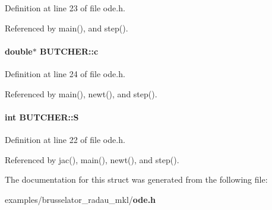 Definition at line 23 of file ode.\+h.



Referenced by main(), and step().

\paragraph[{c}]{\setlength{\rightskip}{0pt plus 5cm}double$\ast$ B\+U\+T\+C\+H\+E\+R\+::c}\label{structBUTCHER_a3dc46ec7591b13f9ba6d948e10729d62}


Definition at line 24 of file ode.\+h.



Referenced by main(), newt(), and step().

\paragraph[{S}]{\setlength{\rightskip}{0pt plus 5cm}int B\+U\+T\+C\+H\+E\+R\+::\+S}\label{structBUTCHER_a175f670f536987c25dcfdcb0856b1393}


Definition at line 22 of file ode.\+h.



Referenced by jac(), main(), newt(), and step().



The documentation for this struct was generated from the following file\+:\begin{DoxyCompactItemize}
\item 
examples/brusselator\+\_\+radau\+\_\+mkl/{\bf ode.\+h}\end{DoxyCompactItemize}
